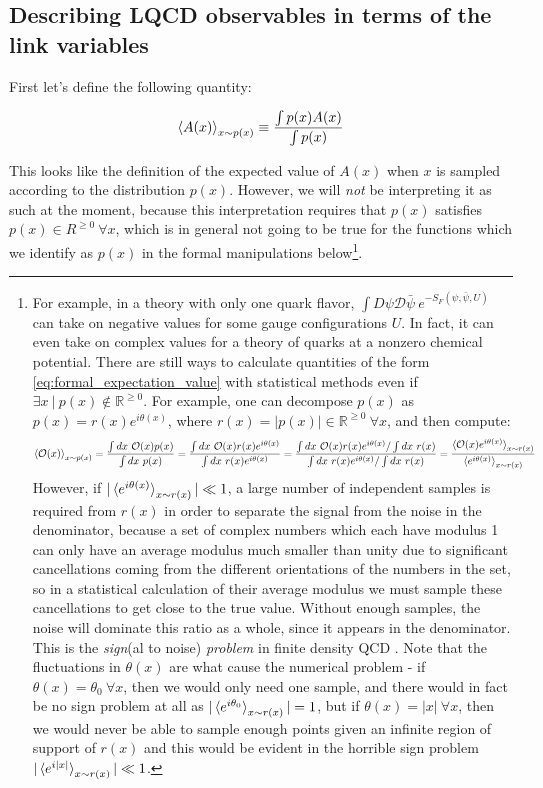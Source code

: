 \documentclass[11pt]{article}
\begin{document}
\subsection{Describing LQCD observables in terms of the link variables}

\label{sec:integrating_out_fermions}

First let's define the following quantity:

\begin{equation}\label{eq:formal_expectation_value}\braket{A(x)}_{x\sim p(x)}\equiv \frac{\int p(x)A(x)}{\int p(x)}\end{equation}

This looks like the definition of the expected value of $A(x)$ when $x$ is sampled according to the distribution $p(x)$. However, we will \textit{not} be interpreting it as such at the moment, because this interpretation requires that $p(x)$ satisfies $p(x)\in R^{\geq 0}\ \forall x$, which is in general not going to be true for the functions which we identify as $p(x)$ in the formal manipulations below\footnote{\label{footnote:probability_dist}For example, in a theory with only one quark flavor, $\int D\psi\mathcal D\bar\psi\ e^{-S_F(\psi,\bar\psi,U)}$ can take on negative values for some gauge configurations $U$. In fact, it can even take on complex values for a theory of quarks at a nonzero chemical potential. There are still ways to calculate quantities of the form \eqref{eq:formal_expectation_value} with statistical methods even if $\exists x\ |\ p(x)\not\in\mathbb R^{\geq 0}$. For example, one can decompose $p(x)$ as $p(x)=r(x)e^{i\theta(x)}$, where $r(x)=|p(x)|\in\mathbb R^{\geq 0}\ \forall x$, and then compute:
\[\braket{\mathcal O(x)}_{x\sim p(x)}=\frac{\int dx\ \mathcal O(x)p(x)}{\int dx\ p(x)}=\frac{\int dx\ \mathcal O(x)r(x)e^{i\theta(x)}}{\int dx\ r(x)e^{i\theta(x)}}=\frac{\int dx\ \mathcal O(x)r(x)e^{i\theta(x)}/\int dx\ r(x)}{\int dx\ r(x)e^{i\theta(x)}/\int dx\ r(x)}=\frac{\braket{\mathcal O(x)e^{i\theta(x)}}_{x\sim r(x)}}{\braket{e^{i\theta(x)}}_{x\sim r(x)}}\]
However, if $|\braket{e^{i\theta(x)}}_{x\sim r(x)}|\ll 1$, a large number of independent samples is required from $r(x)$ in order to separate the signal from the noise in the denominator, because a set of complex numbers which each have modulus 1 can only have an average modulus much smaller than unity due to significant cancellations coming from the different orientations of the numbers in the set, so in a statistical calculation of their average modulus we must sample these cancellations to get close to the true value. Without enough samples, the noise will dominate this ratio as a whole, since it appears in the denominator. This is the \textit{sign}(al to noise)\textit{ problem} in finite density QCD \cite{muroya2003lattice}. Note that the fluctuations in $\theta(x)$ are what cause the numerical problem - if $\theta(x)=\theta_0\ \forall x$, then we would only need one sample, and there would in fact be no sign problem at all as $|\braket{e^{i\theta_0}}_{x\sim r(x)}|=1$, but if $\theta(x)=|x|\ \forall x$, then we would never be able to sample enough points given an infinite region of support of $r(x)$ and this would be evident in the horrible sign problem $|\braket{e^{i|x|}}_{x\sim r(x)}|\ll 1$.
 }.
\end{document}
